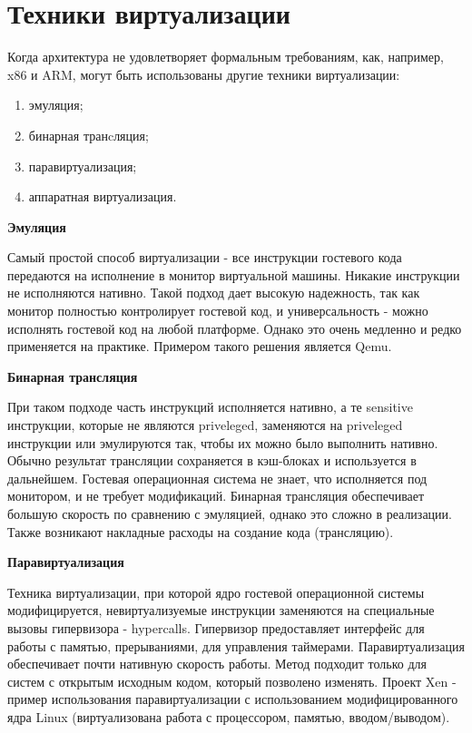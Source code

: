 \section{Техники виртуализации}
Когда архитектура не удовлетворяет формальным требованиям, как, например, x86 и ARM, могут быть использованы другие техники виртуализации:

\begin{enumerate}
    \item эмуляция;
    \item бинарная транcляция;
    \item паравиртуализация;
    \item аппаратная виртуализация.
\end{enumerate}

\textbf{Эмуляция}

Самый простой способ виртуализации - все инструкции гостевого кода передаются  на исполнение в монитор виртуальной машины. Никакие инструкции не исполняются нативно. Такой подход дает высокую надежность, так как монитор полностью контролирует гостевой код, и универсальность - можно исполнять гостевой код на любой платформе. Однако это очень медленно и редко применяется на практике. Примером такого решения является Qemu.

\textbf{Бинарная трансляция}

При таком подходе часть инструкций исполняется нативно, а те sensitive инструкции, которые не являются priveleged, заменяются на priveleged инструкции или эмулируются так, чтобы их можно было выполнить нативно. Обычно результат трансляции сохраняется в кэш-блоках и используется в дальнейшем\cite{bib:vmware_understanding}. Гостевая операционная система не знает, что исполняется под монитором, и не требует модификаций. Бинарная трансляция обеспечивает большую скорость по сравнению с эмуляцией, однако это сложно в реализации. Также возникают накладные расходы на создание кода (трансляцию).

\textbf{Паравиртуализация}

Техника виртуализации, при которой ядро гостевой операционной системы модифицируется, невиртуализуемые инструкции заменяются на специальные вызовы гипервизора - hypercalls. Гипервизор предоставляет интерфейс для работы с памятью, прерываниями, для управления таймерами. Паравиртуализация обеспечивает почти нативную скорость работы. Метод подходит только для систем с открытым исходным кодом, который позволено изменять. Проект Xen\cite{bib:xen_art} - пример использования паравиртуализации  с использованием модифицированного ядра Linux (виртуализована работа с процессором, памятью, вводом/выводом).


